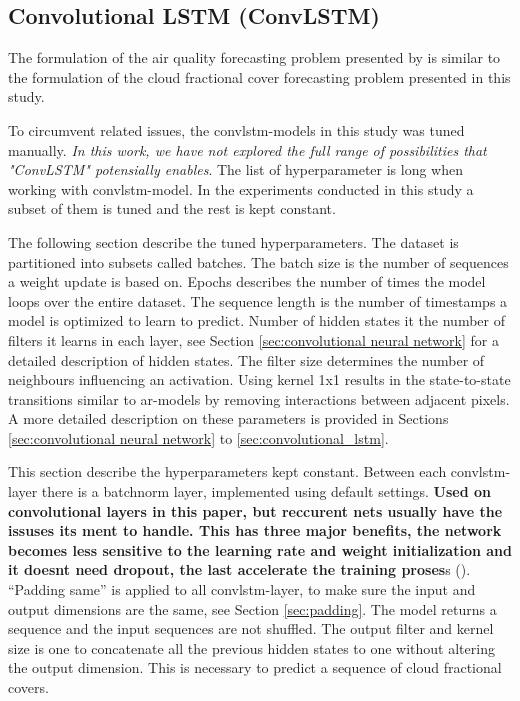 \clearpage

\subsection{Convolutional LSTM (ConvLSTM)}
The formulation of the air quality forecasting problem presented by \citeauthor{SunAirLSTM} is similar to the formulation of the cloud fractional cover forecasting problem presented in this study. 

To circumvent related issues, the \acrshort{convlstm}-models in this study was tuned manually. \textit{In this work, we have not explored the full range of possibilities that "ConvLSTM" potensially enables}. The list of hyperparameter is long when working with \acrshort{convlstm}-model. In the experiments conducted in this study a subset of them is tuned and the rest is kept constant.

The following section describe the tuned hyperparameters. The dataset is partitioned into subsets called batches. The batch size is the number of sequences a weight update is based on. Epochs describes the number of times the model loops over the entire dataset. The sequence length is the number of timestamps a model is optimized to learn to predict. Number of hidden states it the number of filters it learns in each layer, see Section \ref{sec:convolutional neural network} for a detailed description of hidden states. 
The filter size determines the number of neighbours influencing an activation. Using kernel 1x1 results in the state-to-state transitions similar to \acrshort{ar}-models by removing interactions between adjacent pixels. A more detailed description on these parameters is provided in Sections \ref{sec:convolutional neural network} to \ref{sec:convolutional_lstm}. 

This section describe the hyperparameters kept constant. Between each \acrshort{convlstm}-layer there is a \acrfull{batchnorm} layer, implemented using default settings. \textbf{Used on convolutional layers in this paper, but reccurent nets usually have the issuses its ment to handle. This has three major benefits, the network becomes less sensitive to the learning rate and weight initialization and it doesnt need dropout, the last accelerate the training proses}s (\cite{ioffe2015batch}).  ``Padding same'' is applied to all \acrshort{convlstm}-layer, to make sure the input and output dimensions are the same, see Section \ref{sec:padding}. The model returns a sequence and the input sequences are not shuffled. The output filter and kernel size is one to concatenate all the previous hidden states to one without altering the output dimension. This is necessary to predict a sequence of cloud fractional covers. 

